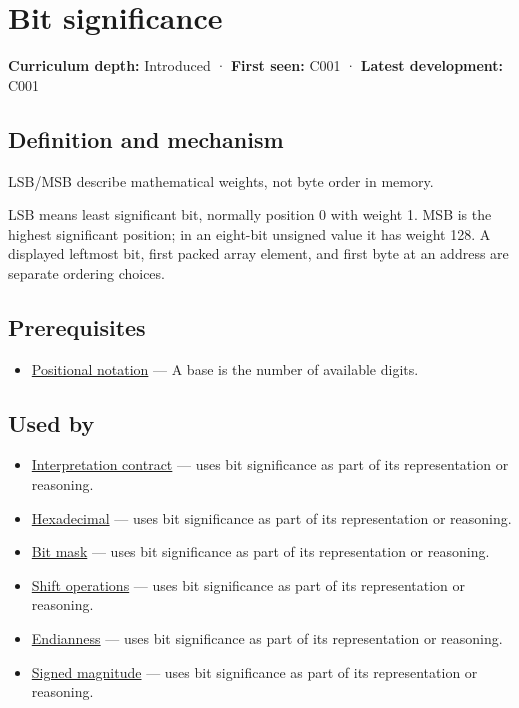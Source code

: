 \hypertarget{appendix-280445746493}{}\label{referencestart:appendix-280445746493}
\section{Bit significance}\label{appendix-280445746493-bit-significance}

\textbf{Curriculum depth:} Introduced · \textbf{First seen:} C001 · \textbf{Latest development:} C001

\subsection{Definition and mechanism}\label{appendix-280445746493-definition-and-mechanism}

LSB/MSB describe mathematical weights, not byte order in memory.

LSB means least significant bit, normally position 0 with weight 1. MSB is the highest significant position; in an eight-bit unsigned value it has weight 128. A displayed leftmost bit, first packed array element, and first byte at an address are separate ordering choices.

\subsection{Prerequisites}\label{appendix-280445746493-prerequisites}

\begin{itemize}
\tightlist
\item
  \hyperref[appendix-83c3f28f7bda]{Positional notation} --- A base is the number of available digits.
\end{itemize}

\subsection{Used by}\label{appendix-280445746493-used-by}

\begin{itemize}
\tightlist
\item
  \hyperref[appendix-f414bd4ed05c]{Interpretation contract} --- uses bit significance as part of its representation or reasoning.
\item
  \hyperref[appendix-6b8075763724]{Hexadecimal} --- uses bit significance as part of its representation or reasoning.
\item
  \hyperref[appendix-dbe5905163c2]{Bit mask} --- uses bit significance as part of its representation or reasoning.
\item
  \hyperref[appendix-73425b25118e]{Shift operations} --- uses bit significance as part of its representation or reasoning.
\item
  \hyperref[appendix-bc07c3d25b18]{Endianness} --- uses bit significance as part of its representation or reasoning.
\item
  \hyperref[appendix-ce20506c8532]{Signed magnitude} --- uses bit significance as part of its representation or reasoning.
\end{itemize}

